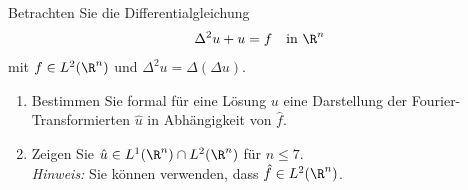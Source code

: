 
\begin{exercise}

Betrachten Sie die Differentialgleichung
\begin{align*}
  \Delta^2 u +  u = f \quad \text{in } \R^n
\end{align*}
mit $f \in L^2(\R^n)$ und $\Delta^2 u = \Delta(\Delta u)$.
\begin{enumerate}[label = (\roman*)]
  \item Bestimmen Sie formal für eine Lösung $u$ eine Darstellung der
  Fourier-Transformierten $\hat{u}$ in Abhängigkeit von $\hat{f}$.
  \item Zeigen Sie $\hat{u} \in L^1(\R^n) \cap L^2(\R^n)$ für $n \leq 7$. \\
  \textit{Hinweis:} Sie können verwenden, dass $\hat{f} \in L^2(\R^n)$.
\end{enumerate}

\end{exercise}


